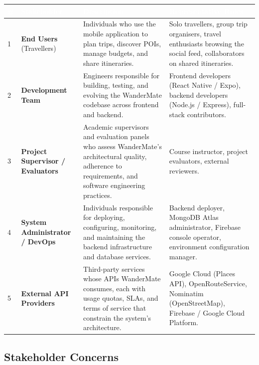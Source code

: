 \documentclass[12pt, a4paper]{article}
\newcommand{\thcell}[1]{\textcolor{white}{\textbf{\small #1}}}
\begin{document}
\begin{longtable}{C{0.5cm} L{2.8cm} L{4.0cm} L{6.0cm}}
\toprule
{}
\thcell{\#} & \thcell{Stakeholder} & \thcell{Description} & \thcell{Representative Roles} \\
\midrule
\endhead
\bottomrule
\endfoot

1 & \textbf{End Users} (Travellers) & Individuals who use the mobile application to plan trips, discover POIs, manage budgets, and share itineraries. & Solo travellers, group trip organisers, travel enthusiasts browsing the social feed, collaborators on shared itineraries. \\

2 & \textbf{Development Team} & Engineers responsible for building, testing, and evolving the WanderMate codebase across frontend and backend. & Frontend developers (React Native / Expo), backend developers (Node.js / Express), full-stack contributors. \\

3 & \textbf{Project Supervisor / Evaluators} & Academic supervisors and evaluation panels who assess WanderMate's architectural quality, adherence to requirements, and software engineering practices. & Course instructor, project evaluators, external reviewers. \\

4 & \textbf{System Administrator / DevOps} & Individuals responsible for deploying, configuring, monitoring, and maintaining the backend infrastructure and database services. & Backend deployer, MongoDB Atlas administrator, Firebase console operator, environment configuration manager. \\

5 & \textbf{External API Providers} & Third-party services whose APIs WanderMate consumes, each with usage quotas, SLAs, and terms of service that constrain the system's architecture. & Google Cloud (Places API), OpenRouteService, Nominatim (OpenStreetMap), Firebase / Google Cloud Platform. \\

\end{longtable}

\subsection{Stakeholder Concerns}
\end{document}
